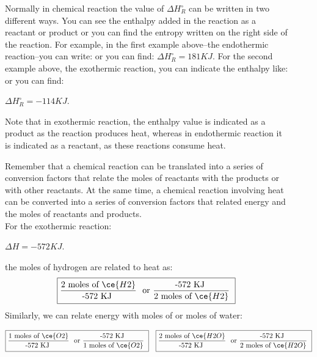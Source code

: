 \documentclass[main.tex]{subfiles}
\begin{document}
\begin{description}
\item[]
Normally in chemical reaction the value of $\Delta H^{\circ}_R$ can be written in two different ways. You can see the enthalpy added in the reaction as a reactant or product or you can find the entropy written on the right side of the reaction. For example, in the first example above--the endothermic reaction--you can write:
or you can find:
 \hspace*{0pt}\hfill $\Delta H^{\circ}_R=181KJ$.
For the second example above, the exothermic reaction, you can indicate the enthalpy like:
or you can find:
\begin{center} \hspace*{0pt}\hfill $\Delta H^{\circ}_R=-114KJ$.\end{center}
Note that in exothermic reaction, the enthalpy value is indicated as a product as the reaction produces heat, whereas in endothermic reaction it is indicated as a reactant, as these reactions consume heat.

  \item[] 
Remember that a chemical reaction can be translated into a series of conversion factors that relate the moles of reactants with the products or with other reactants. At the same time, a chemical reaction involving heat can be converted into a series of conversion factors that related energy and the moles of reactants and products. \\
For the exothermic reaction:
\begin{center} \hspace*{0pt}\hfill $\Delta H=-572KJ$.\end{center}
the moles of hydrogen are related to heat as:
\begin{equation*}
\boxed{   \frac{\text{2 moles of }\ce{H2}}{\text{-572 KJ }}\ \text{ or  } \frac{ \text{-572 KJ } }{ \text{2 moles of } \ce{H2} }\   }
\end{equation*}
Similarly, we can relate energy with moles of   or moles of water:

\begin{equation*}
\boxed{   \frac{\text{1 moles of }\ce{O2}}{\text{-572 KJ }}\ \text{ or  } \frac{\text{-572 KJ } }{ \text{1 moles of } \ce{O2} }\   }\quad
\boxed{   \frac{\text{2 moles of }\ce{H2O}}{\text{-572 KJ }}\ \text{ or  } \frac{ \text{-572 KJ }}{  \text{2 moles of } \ce{H2O} }\   }
\end{equation*}



\end{description}
\end{document}
